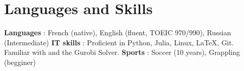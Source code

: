 \documentclass[a4paper,
		varspacetitle=-2mm, %
		varspacesection=2.5mm, %
		vartopmargin=0.8cm,  %
		varbottommargin=0.5cm %
	]{cv}
\begin{document}
\section{Languages and Skills }
\vspace{2mm}
\textbf{Languages} : French (native), English (fluent, TOEIC 970/990), Russian (Intermediate)\newline
\vspace{-2mm}\newline
\textbf{IT skills} : Proficient in Python, Julia, Linux, \LaTeX, Git. Familiar with \CC and the Gurobi Solver.\newline
\vspace{-2mm}\newline
\textbf{Sports} :  Soccer (10 years), Grappling (begginer)
\end{document}
